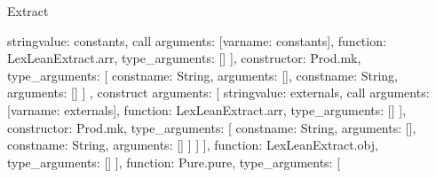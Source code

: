 \begin{lexlean}{Extract}
\begin{toolingmodule}
{{{{{{{{{{{{{{{{{{                                                          string{value: constants},
                                                          call{
                                                            arguments: [var{name: constants}],
                                                            function: LexLeanExtract.arr,
                                                            type_arguments: []
                                                          }
                                                        ],
                                                        constructor: Prod.mk,
                                                        type_arguments: [
                                                          const{name: String, arguments: []},
                                                          const{name: String, arguments: []}
                                                        ]
                                                      },
                                                      construct{
                                                        arguments: [
                                                          string{value: externals},
                                                          call{
                                                            arguments: [var{name: externals}],
                                                            function: LexLeanExtract.arr,
                                                            type_arguments: []
                                                          }
                                                        ],
                                                        constructor: Prod.mk,
                                                        type_arguments: [
                                                          const{name: String, arguments: []},
                                                          const{name: String, arguments: []}
                                                        ]
                                                      }
                                                    ]
                                                  }
                                                ],
                                                function: LexLeanExtract.obj,
                                                type_arguments: []
                                              }
                                            ],
                                            function: Pure.pure,
                                            type_arguments: [
}}}}}}}}}}}}}}}
\end{toolingmodule}
\end{lexlean}
